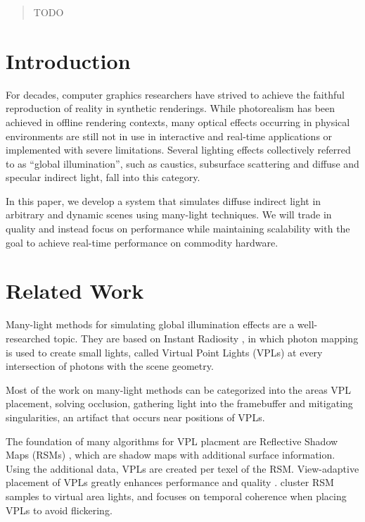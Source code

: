 

\begin{abstract}
TODO
\end{abstract}



\section{Introduction}
For decades, computer graphics researchers have strived to achieve the faithful reproduction of reality in synthetic renderings. While photorealism has been achieved in offline rendering contexts, many optical effects occurring in physical environments are still not in use in interactive and real-time applications or implemented with severe limitations. Several lighting effects collectively referred to as ``global illumination'', such as caustics, subsurface scattering and diffuse and specular indirect light, fall into this category.

In this paper, we develop a system that simulates diffuse indirect light in arbitrary and dynamic scenes using many-light techniques. We will trade in quality and instead focus on performance while maintaining scalability with the goal to achieve real-time performance on commodity hardware.




\section{Related Work}

Many-light methods for simulating global illumination effects are a well-researched topic. They are based on Instant Radiosity \cite{Keller:1997:InstantRadiosity}, in which photon mapping is used to create small lights, called Virtual Point Lights (VPLs) at every intersection of photons with the scene geometry.


Most of the work on many-light methods can be categorized into the areas VPL placement, solving occlusion, gathering light into the framebuffer and mitigating singularities, an artifact that occurs near positions of VPLs.


The foundation of many algorithms for VPL placment are Reflective Shadow Maps (RSMs) \cite{Dachsbacher:2005:RSM}, which are shadow maps with additional surface information. Using the additional data, VPLs are created per texel of the RSM. View-adaptive placement of VPLs greatly enhances performance and quality \cite{ritschel2011ismsViewAdaptive}. \cite{prutkin2012reflective} cluster RSM samples to virtual area lights, and \cite{hedman2016sequential} focuses on temporal coherence when placing VPLs to avoid flickering.

